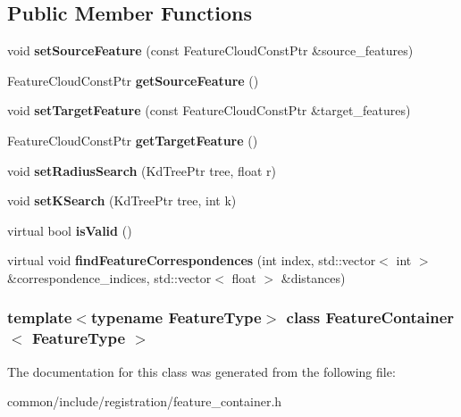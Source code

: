 \subsection*{Public Member Functions}
\begin{DoxyCompactItemize}
\item 
\hypertarget{classFeatureContainer_a25bae377554ca46d3ceeb0e75b94a1df}{
void {\bfseries setSourceFeature} (const FeatureCloudConstPtr \&source\_\-features)}
\label{classFeatureContainer_a25bae377554ca46d3ceeb0e75b94a1df}

\item 
\hypertarget{classFeatureContainer_ae60b59ddad5f99c33976dacc8f51313f}{
FeatureCloudConstPtr {\bfseries getSourceFeature} ()}
\label{classFeatureContainer_ae60b59ddad5f99c33976dacc8f51313f}

\item 
\hypertarget{classFeatureContainer_a9b33939542a0e0a44ea929fa94144fd0}{
void {\bfseries setTargetFeature} (const FeatureCloudConstPtr \&target\_\-features)}
\label{classFeatureContainer_a9b33939542a0e0a44ea929fa94144fd0}

\item 
\hypertarget{classFeatureContainer_a6b9b90e2d4c0cffa66a6aad566a5398b}{
FeatureCloudConstPtr {\bfseries getTargetFeature} ()}
\label{classFeatureContainer_a6b9b90e2d4c0cffa66a6aad566a5398b}

\item 
\hypertarget{classFeatureContainer_afba51926e3b8f1469f2056c3a0e67233}{
void {\bfseries setRadiusSearch} (KdTreePtr tree, float r)}
\label{classFeatureContainer_afba51926e3b8f1469f2056c3a0e67233}

\item 
\hypertarget{classFeatureContainer_a5eb230cc0dae19264e37004cd77f0084}{
void {\bfseries setKSearch} (KdTreePtr tree, int k)}
\label{classFeatureContainer_a5eb230cc0dae19264e37004cd77f0084}

\item 
\hypertarget{classFeatureContainer_a42bd311329ec0278af0f744cbbf224ef}{
virtual bool {\bfseries isValid} ()}
\label{classFeatureContainer_a42bd311329ec0278af0f744cbbf224ef}

\item 
\hypertarget{classFeatureContainer_a666fa9a8410848c218a816680704e846}{
virtual void {\bfseries findFeatureCorrespondences} (int index, std::vector$<$ int $>$ \&correspondence\_\-indices, std::vector$<$ float $>$ \&distances)}
\label{classFeatureContainer_a666fa9a8410848c218a816680704e846}

\end{DoxyCompactItemize}
\subsubsection*{template$<$typename FeatureType$>$ class FeatureContainer$<$ FeatureType $>$}



The documentation for this class was generated from the following file:\begin{DoxyCompactItemize}
\item 
common/include/registration/feature\_\-container.h\end{DoxyCompactItemize}

